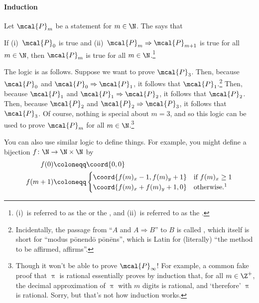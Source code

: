 \paragraph{Induction} Let $\mcal{P}_m$ be a statement for $m\in \N$.  The  says that
\begin{displayquote}
	If (i)~$\mcal{P}_0$ is true and (ii)~$\mcal{P}_m\Rightarrow \mcal{P}_{m+1}$ is true for all $m\in \N$, then $\mcal{P}_m$ is true for all $m\in \N$.\footnote{(i)~is referred to as the  or the , and (ii)~is referred to as the .}
\end{displayquote}
The logic is as follows.  Suppose we want to prove $\mcal{P}_3$.  Then, because $\mcal{P}_0$ and $\mcal{P}_0\Rightarrow \mcal{P}_1$, it follows that $\mcal{P}_1$.\footnote{Incidentally, the passage from ``$A$ and $A\Rightarrow B$'' to $B$ is called , which itself is short for ``modus pōnendō pōnēns'', which is Latin for (literally) ``the method to be affirmed, affirms''.}  Then, because $\mcal{P}_1$ and $\mcal{P}_1\Rightarrow \mcal{P}_2$, it follows that $\mcal{P}_2$.  Then, because $\mcal{P}_2$ and $\mcal{P}_2\Rightarrow \mcal{P}_3$, it follows that $\mcal{P}_3$.  Of course, nothing is special about $m=3$, and so this logic can be used to prove $\mcal{P}_m$ for all $m\in \N$.\footnote{Though it won't be able to prove $\mcal{P}_{\infty}$!  For example, a common fake proof that $\uppi$ is rational essentially proves by induction that, for all $m\in \Z ^+$, the decimal approximation of $\uppi$ with $m$ digits is rational, and `therefore' $\uppi$ is rational.  Sorry, but that's not how induction works.}

You can also use similar logic to define things.  For example, you might define a bijection $f\colon \N \rightarrow \N \times \N$ by
\begin{equation}
\begin{split}
f(0) & \coloneqq \coord{0,0} \\
f(m+1) & \coloneqq \begin{cases}\coord{f(m)_x-1,f(m)_y+1} & \text{if }f(m)_x\geq 1 \\ \coord{f(m)_x+f(m)_y+1,0} & \text{otherwise.\footnotemark}\end{cases}
\end{split}
\end{equation}

